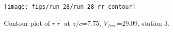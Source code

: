 \begin{figure}[H]
\centering
\texttt{[image: figs/run\_28/run\_28\_rr\_contour]}
\caption{Contour plot of $\overline{r^\prime r^\prime}$ at $z/c$=7.75, $V_{free}$=29.09, station 3.}
\label{fig:run_28_rr_contour}
\end{figure}


